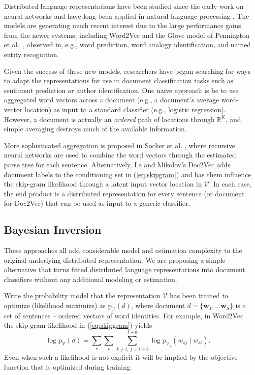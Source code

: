 \documentclass[11pt]{article}
\begin{document}
Distributed language representations have been studied since the early work on
neural networks \cite{rumelhart_learning_1986} and have long been applied in
natural language processing \cite{morin_hierarchical_2005}.  The models are
generating much recent interest due to the large performance gains from the
newer systems, including Word2Vec and the Glove model of Pennington et
al.~, observed in, e.g., word
prediction, word analogy identification, and named entity recognition.

Given the success of these new models, researchers have begun searching for
ways to adapt the representations for use in document classification tasks
such as sentiment prediction or author identification.  One  naive approach is be
to use aggregated word vectors across a document (e.g., a document's average
word-vector location) as input to a standard classifier (e.g.,
logistic regression).  However, a document is actually  an {\it ordered} path
of  locations through $\mathds{R}^K$, and simple averaging destroys much of the available
information.  

More sophisticated aggregation is proposed in Socher et al.
, where recursive neural
networks are used to combine the word vectors through the estimated parse tree
for each sentence.  Alternatively,  Le and Mikolov's Doc2Vec
 adds document labels to the conditioning set
in (\ref{eq:skipgram}) and has them influence the skip-gram likelihood through
a latent input vector location in $\mathcal{V}$. In each case, the end product
is a distributed representation for every sentence (or document for Doc2Vec)
that can be used as input to a generic classifier.

\subsection{Bayesian Inversion}

These approaches all add considerable model and estimation complexity to the
original underlying distributed representation.  We are proposing a
simple alternative that turns fitted distributed language representations into
document classifiers without any additional modeling or estimation.  

Write the probability model that the representation $\mathcal{V}$ has been
trained to optimize (likelihood maximize) as $\mathrm{p}_{ \mathcal{V}}(d )$,
where document $d = \{\mathbf{w}_1, ... \mathbf{w}_S\}$ is a set of sentences 
-- ordered vectors of word identities.  
For example, in Word2Vec the skip-gram likelihood in
(\ref{eq:skipgram}) yields
\begin{equation}\label{eq:fulllhd}
\log\mathrm{p}_{ \mathcal{V}}(d) = \sum_s \sum_{t} \sum_{k\neq t,~j=t-b}^{t+b} 
\log\mathrm{p}_{ \mathcal{V}_y}(w_{sj}\mid w_{st} ).
\end{equation}
Even when such a likelihood is not explicit it will be implied by the objective function that is optimized during training.
\end{document}
